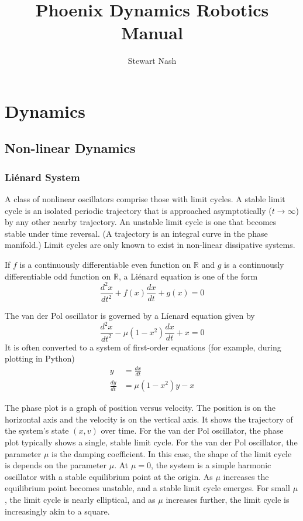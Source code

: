\documentclass[11pt]{book}
\theoremstyle{example}
\begin{document}
\title{Phoenix Dynamics Robotics Manual}
\author{Stewart Nash}

\maketitle

\tableofcontents

\mainmatter

\chapter{Dynamics}

\section{Non-linear Dynamics}

\subsection{Li\'enard System}
A class of nonlinear oscillators comprise those with limit cycles. A stable limit cycle is an isolated periodic trajectory that is approached asymptotically ($t\rightarrow\infty$) by any other nearby trajectory. An unstable limit cycle is one that becomes stable under time reversal. (A trajectory is an integral curve in the phase manifold.) Limit cycles are only known to exist in non-linear dissipative systems.

If $f$ is a continuously differentiable even function on $\mathbb{R}$ and $g$ is a continuously differentiable odd function on $\mathbb{R}$, a Li\'enard equation is one of the form
\begin{equation}
	\frac{d^2x}{dt^2}+f(x)\frac{dx}{dt}+g(x)=0
\end{equation}	 

The van der Pol oscillator is governed by a L\'ienard equation given by
\begin{equation}
	\frac{d^2x}{dt^2}-\mu(1-x^2)\frac{dx}{dt}+x=0
\end{equation}
It is often converted to a system of first-order equations (for example, during plotting in Python)
\begin{align}
	y&=\frac{dx}{dt}\\
	\frac{dy}{dt}&=\mu(1-x^2)y-x
\end{align}

The phase plot is a graph of position versus velocity. The position is on the horizontal axis and the velocity is on the vertical axis. It shows the trajectory of the system's state $(x, v)$ over time. For the van der Pol oscillator, the phase plot typically shows a single, stable limit cycle. For the van der Pol oscillator, the parameter $\mu$ is the damping coefficient. In this case, the shape of the limit cycle is depends on the parameter $\mu$. At $\mu=0$, the system is a simple harmonic oscillator with a stable equilibrium point at the origin. As $\mu$ increases the equilibrium point becomes unstable, and a stable limit cycle emerges. For small $\mu$, the limit cycle is nearly elliptical, and as $\mu$ increases further, the limit cycle is increasingly akin to a square.
\end{document}
